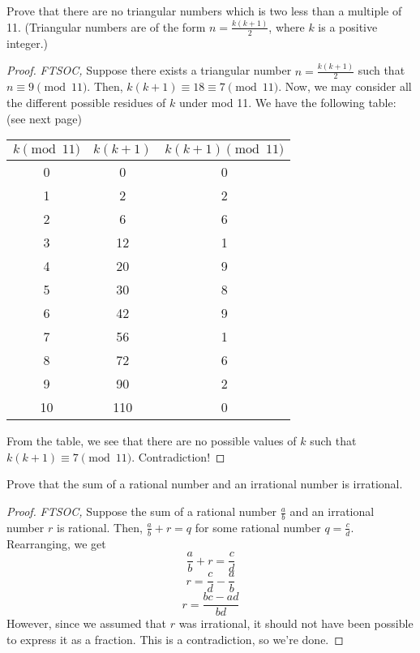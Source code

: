 \documentclass{article}
\theoremstyle{mytheoremstyle}
\theoremstyle{mytheoremstyle}
\theoremstyle{myproblemstyle}
\begin{document}
    \begin{problem}
        Prove that there are no triangular numbers which is two less than a multiple of 11. (Triangular numbers are of the form $n = \frac{k(k+1)}{2}$, where $k$ is a positive integer.)
    \end{problem}

    \begin{proof}
        \textit{FTSOC,} Suppose there exists a triangular number $n = \frac{k(k+1)}{2}$ such that $n \equiv 9 \pmod{11}$. Then, $k(k+1) \equiv 18 \equiv 7 \pmod{11}$. Now, we may consider all the different possible residues of $k$ under mod 11. We have the following table: (see next page)
        \begin{center}
            \begin{tabular}{c|c|c}
                $k \pmod{11}$ & $k(k+1)$ & $k(k+1) \pmod{11}$\\
                \hline
                0 & 0 & 0\\
                1 & 2 & 2\\
                2 & 6 & 6\\
                3 & 12 & 1\\
                4 & 20 & 9\\
                5 & 30 & 8\\
                6 & 42 & 9\\
                7 & 56 & 1\\
                8 & 72 & 6\\
                9 & 90 & 2\\
                10 & 110 & 0\\
            \end{tabular}
        \end{center}
        From the table, we see that there are no possible values of $k$ such that $k(k+1) \equiv 7 \pmod{11}$. Contradiction!
    \end{proof}

    \begin{problem}
        Prove that the sum of a rational number and an irrational number is irrational.
    \end{problem}

    \begin{proof}
        \textit{FTSOC,} Suppose the sum of a rational number $\frac{a}{b}$ and an irrational number $r$ is rational. Then, $\frac{a}{b} + r = q$ for some rational number $q = \frac{c}{d}$. Rearranging, we get \[\frac{a}{b} + r = \frac{c}{d}\] \[r = \frac{c}{d} - \frac{a}{b}\] \[r = \frac{bc - ad}{bd}\] However, since we assumed that $r$ was irrational, it should not have been possible to express it as a fraction. This is a contradiction, so we're done.    
    \end{proof}
\end{document}

